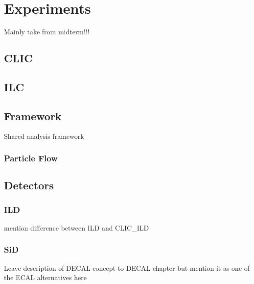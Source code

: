 \chapter{Experiments}

Mainly take from  midterm!!!

\section{CLIC}

\section{ILC}

\section{Framework}

Shared analysis framework

\subsection{Particle Flow}

\section{Detectors}

\subsection{ILD}

mention difference between ILD and CLIC\_ILD

\subsection{SiD}


Leave description of DECAL concept to DECAL chapter but mention it as one of the ECAL alternatives here
